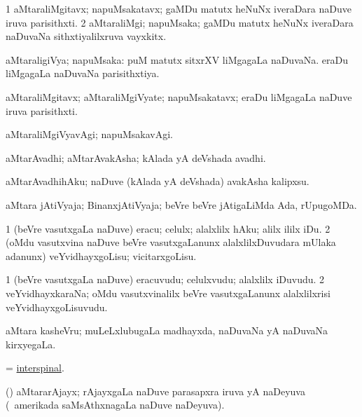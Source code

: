 \bentry
{}
\gl{\nA}
\bmng
\bnum
\num{1} aMtaraliMgitavx; napuMsakatavx; gaMDu matutx heNuNx iveraDara naDuve iruva parisithxti. 
\num{2} aMtaraliMgi; napuMsaka; gaMDu matutx heNuNx iveraDara naDuvaNa sithxtiyalilxruva vayxkitx. 
\enum
\emng
\eentry

\bentry
{}
\gl{\gu}
\bmng
aMtaraligiVya; napuMsaka: 
\banum
{} puM matutx sitxrXV liMgagaLa naDuvaNa. 
 eraDu liMgagaLa naDuvaNa parisithxtiya. 
\eanum
\emng
\eentry

\bentry
{}
\gl{\nA}
\bmng
aMtaraliMgitavx; aMtaraliMgiVyate; napuMsakatavx; eraDu liMgagaLa naDuve iruva parisithxti. 
\emng
\eentry

\bentry
{}
\gl{\kirxvi}
\bmng
aMtaraliMgiVyavAgi; napuMsakavAgi. 
\emng
\eentry

\bentry
{}
\gl{\nA}
\bmng
aMtarAvadhi; aMtarAvakAsha; kAlada yA deVshada avadhi. 
\emng
\eentry

\bentry
{}
\gl{\sakirx}
\bmng
aMtarAvadhihAku; naDuve (kAlada yA deVshada) avakAsha kalipxsu. 
\emng
\eentry

\bentry
{}
\gl{\gu}
\bmng
aMtara jAtiVyaja; BinanxjAtiVyaja; beVre beVre jAtigaLiMda Ada, rUpugoMDa. 
\emng
\eentry

\bentry
{}
\gl{\sakirx}
\bmng
\bnum
\num{1} (beVre vasutxgaLa naDuve) eracu; celulx; alalxlilx hAku; alilx ililx iDu. 
\num{2} (oMdu vasutxvina naDuve beVre vasutxgaLanunx alalxlilxDuvudara mUlaka adanunx) veYvidhayxgoLisu; vicitarxgoLisu. 
\enum
\emng
\eentry

\bentry
{}
\gl{\nA}
\bmng
\bnum
\num{1} (beVre vasutxgaLa naDuve) eracuvudu; celulxvudu; alalxlilx iDuvudu. 
\num{2} veYvidhayxkaraNa; oMdu vasutxvinalilx beVre vasutxgaLanunx alalxlilxrisi veYvidhayxgoLisuvudu. 
\enum
\emng
\eentry

\bentry
{}
\gl{\gu}
\bmng
aMtara kasheVru; muLeLxlubugaLa madhayxda, naDuvaNa yA naDuvaNa kirxyegaLa. 
\emng
\eentry

\bentry
{}
\gl{\gu}
\bmng
= \hyperlink{interspinal}{interspinal}. 
\emng
\eentry

\bentry
{}
\gl{\gu}
\bmng
(\ame) aMtararAjayx; rAjayxgaLa naDuve parasapxra iruva yA naDeyuva (\kanmu\ amerikada saMsAthxnagaLa naDuve naDeyuva). 
\emng
\eentry

